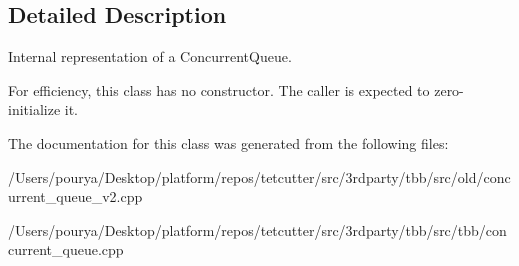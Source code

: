 \subsection{Detailed Description}
Internal representation of a Concurrent\+Queue. 

For efficiency, this class has no constructor. The caller is expected to zero-\/initialize it. 

The documentation for this class was generated from the following files\+:\begin{DoxyCompactItemize}
\item 
/\+Users/pourya/\+Desktop/platform/repos/tetcutter/src/3rdparty/tbb/src/old/concurrent\+\_\+queue\+\_\+v2.\+cpp\item 
/\+Users/pourya/\+Desktop/platform/repos/tetcutter/src/3rdparty/tbb/src/tbb/concurrent\+\_\+queue.\+cpp\end{DoxyCompactItemize}
